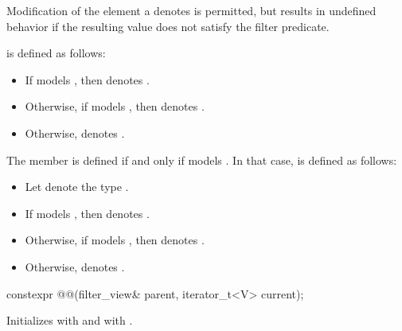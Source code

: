 \pnum
Modification of the element a  denotes is
permitted, but results in undefined behavior if the resulting value does not
satisfy the filter predicate.

\pnum
{} is defined as follows:
\begin{itemize}
\item If  models , then
 denotes .

\item Otherwise, if  models , then
 denotes .

\item Otherwise,  denotes .
\end{itemize}

\pnum
The member   is defined
if and only if  models .
In that case,
 is defined as follows:
\begin{itemize}
\item Let  denote the type
.

\item If  models
,
then  denotes .

\item Otherwise, if   models
,
then  denotes .

\item Otherwise,  denotes .
\end{itemize}

%
\begin{itemdecl}
constexpr @@(filter_view& parent, iterator_t<V> current);
\end{itemdecl}

\begin{itemdescr}
\pnum
\effects
Initializes  with  and
 with .
\end{itemdescr}

